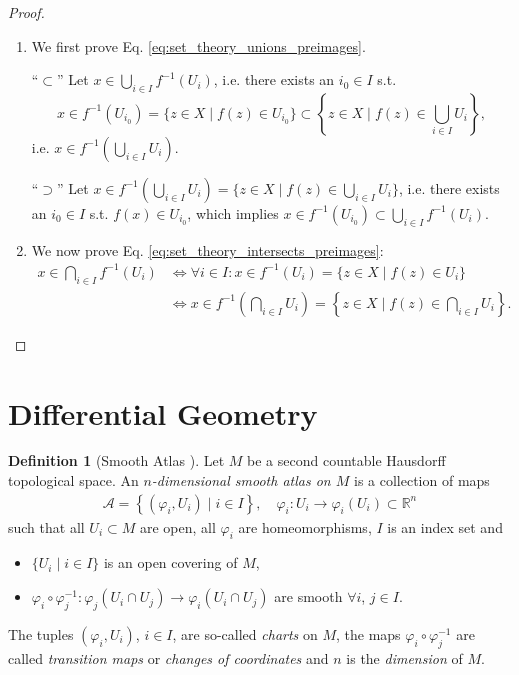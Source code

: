 \documentclass[12pt, a4paper]{article}
\numberwithin{equation}{section}
\theoremstyle{definition}
\theoremstyle{definition}
\newtheorem{defn}[thm]{Definition} %
\begin{document}
	\begin{proof}
		\begin{enumerate}
			\item We first prove Eq. \eqref{eq:set_theory_unions_preimages}. 		
			
			\enquote{$\subset$} Let $x\in \bigcup_{i\in I}f^{-1}(U_i)$, i.e. there exists an $i_0\in I$ s.t. $$x\in f^{-1}(U_{i_0}) = \{z\in X\mid f(z)\in U_{i_0}\} \subset \left\{ z\in X\mid f(z)\in \bigcup_{i\in I}U_i \right\},$$
			i.e. $x\in f^{-1}\left(\bigcup_{i\in I}U_i\right)$.
			
			\enquote{$\supset$} Let $x\in f^{-1}(\bigcup_{i\in I}U_i) = \{z\in X \mid f(z)\in \bigcup_{i\in I}U_i\}$, i.e. there exists an $i_0\in I$ s.t. $f(x)\in U_{i_0}$, which implies $x\in f^{-1}(U_{i_0}) \subset \bigcup_{i\in I}f^{-1}(U_i)$.
			
			\item We now prove Eq. \eqref{eq:set_theory_intersects_preimages}:
			\begin{align*}
				x\in \bigcap_{i\in I}f^{-1}(U_i) &\Leftrightarrow \forall i\in I: x\in f^{-1}(U_i) = \{z\in X\mid f(z)\in U_i\}
				\\ &\Leftrightarrow x\in f^{-1}\left(\bigcap_{i\in I}U_i\right) = \left\{z\in X\mid f(z)\in \bigcap_{i\in I}U_i\right\}.
			\end{align*}
		\end{enumerate}
	\end{proof}
	
	\newpage 
	\section{Differential Geometry}
	\begin{samepage}
		\begin{defn}[Smooth Atlas \cite{Lindemann-lec1}]
			Let $M$ be a second countable Hausdorff topological space. An \textit{$n$-dimensional smooth atlas on $M$}  is a collection of maps
			\begin{align*}
				\mathcal A = \left\{\left(\varphi_i, U_i\right)\mid i\in I\right\}, \quad \varphi_i: U_i \rightarrow \varphi_i(U_i) \subset \mathbb R^n
			\end{align*}
			such that all $U_i \subset M$ are open, all $\varphi_i$ are homeomorphisms, $I$ is an index set and 
			\begin{itemize}
				\item $\{U_i \mid i\in I\}$ is an open covering of $M$, 
				\item $\varphi_i \circ \varphi_j^{-1}: \varphi_j(U_i \cap U_j) \rightarrow \varphi_i(U_i \cap U_j)$ are smooth $\forall i$, $j \in I$. 
			\end{itemize}
			The tuples $(\varphi_i, U_i)$, $i\in I$, are so-called \textit{charts} on $M$, the maps $\varphi_i\circ \varphi_j^{-1}$ are called \textit{transition maps} or \textit{changes of coordinates} and $n$ is the \textit{dimension} of $M$.
		\end{defn}
	\end{samepage}
\end{document}
